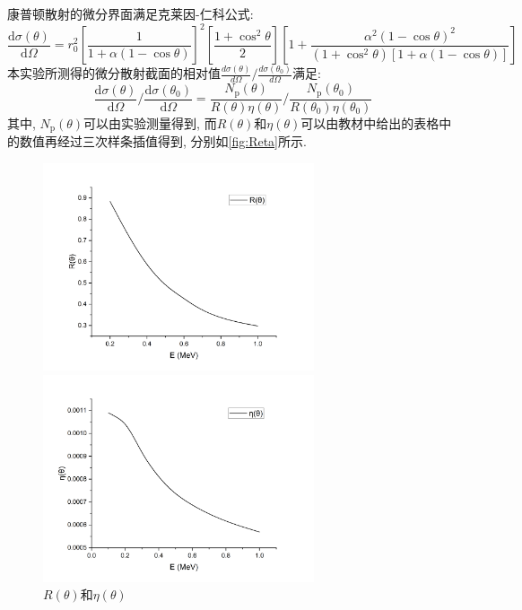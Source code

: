 \documentclass[font=default]{mpltx}
\begin{document}
康普顿散射的微分界面满足克莱因-仁科公式: 
$$ 
\frac{\mathrm{d}\sigma(\theta)}{\mathrm{d}\Omega} = r_0^2 \left[ \frac{1}{1 + \alpha(1 - \cos\theta)} \right]^2 \left[ \frac{1 + \cos^2\theta}{2} \right] \left[ 1 + \frac{\alpha^2(1 - \cos\theta)^2}{(1 + \cos^2\theta)\left[ 1 + \alpha(1 - \cos\theta) \right]} \right]
$$
本实验所测得的微分散射截面的相对值$\frac{d\sigma(\theta)}{d\Omega}/\frac{d\sigma(\theta_0)}{d\Omega}$满足: 
$$
\frac{\mathrm{d}\sigma(\theta)}{\mathrm{d}\Omega} \bigg/ \frac{\mathrm{d}\sigma(\theta_0)}{\mathrm{d}\Omega} = \frac{N_{\mathrm{p}}(\theta)}{R(\theta)\eta(\theta)} \bigg/ \frac{N_{\mathrm{p}}(\theta_0)}{R(\theta_0)\eta(\theta_0)}
$$
其中, $N_{\mathrm{p}}(\theta)$可以由实验测量得到, 
而$R(\theta)$和$\eta(\theta)$可以由教材\cite{jindaiwulishiyan}中给出的表格中的数值再经过三次样条插值得到, 分别如\autoref{fig:Reta}所示. 
\begin{figure}[htbp]
  \centering
  \begin{minipage}[t]{0.6\textwidth}
  \centering
  \includegraphics[width=8cm]{fig/R.png}
  \end{minipage}
  \begin{minipage}[t]{0.6\textwidth}
  \centering
  \includegraphics[width=8cm]{fig/yita.png}
  \end{minipage}
  \caption{$R(\theta)$和$\eta(\theta)$}
  \label{fig:Reta}
\end{figure}
\end{document}
